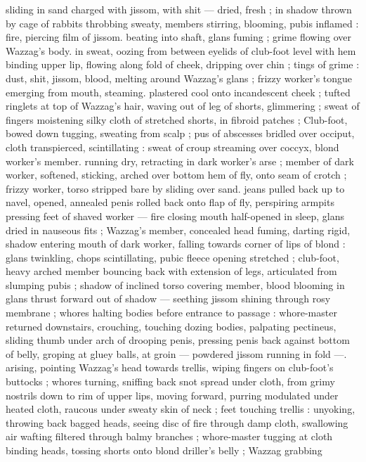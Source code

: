 sliding in sand charged with jissom, with shit --- dried, fresh ; in
shadow thrown by cage of rabbits throbbing sweaty, members
stirring, blooming, pubis inflamed : fire, piercing film of jissom.
beating into shaft, glans fuming ; grime flowing over Wazzag's body.
in sweat, oozing from between eyelids of club-foot level with hem
binding upper lip, flowing along fold of cheek, dripping over chin ;
tings of grime : dust, shit, jissom, blood, melting around Wazzag's
glans ; frizzy worker's tongue emerging from mouth, steaming.
plastered cool onto incandescent cheek ; tufted ringlets at top of
Wazzag's hair, waving out of leg of shorts, glimmering ; sweat of
fingers moistening silky cloth of stretched shorts, in fibroid patches
; Club-foot, bowed down tugging, sweating from scalp ; pus of
abscesses bridled over occiput, cloth transpierced, scintillating :
sweat of croup streaming over coccyx, blond worker's member.
running dry, retracting in dark worker's arse ; member of dark
worker, softened, sticking, arched over bottom hem of fly, onto seam
of crotch ; frizzy worker, torso stripped bare by sliding over sand.
jeans pulled back up to navel, opened, annealed penis rolled back
onto flap of fly, perspiring armpits pressing feet of shaved worker ---
fire closing mouth half-opened in sleep, glans dried in nauseous fits
; Wazzag's member, concealed head fuming, darting rigid, shadow
entering mouth of dark worker, falling towards corner of lips of
blond : glans twinkling, chops scintillating, pubic fleece opening
stretched ; club-foot, heavy arched member bouncing back with
extension of legs, articulated from slumping pubis ; shadow of
inclined torso covering member, blood blooming in glans thrust
forward out of shadow --- seething jissom shining through rosy
membrane ; whores halting bodies before entrance to passage :
whore-master returned downstairs, crouching, touching dozing
bodies, palpating pectineus, sliding thumb under arch of drooping
penis, pressing penis back against bottom of belly, groping at gluey
balls, at groin --- powdered jissom running in fold ---. arising,
pointing Wazzag's head towards trellis, wiping fingers on club-foot's
buttocks ; whores turning, sniffing back snot spread under cloth,
from grimy nostrils down to rim of upper lips, moving forward,
purring modulated under heated cloth, raucous under sweaty skin of
neck ; feet touching trellis : unyoking, throwing back bagged heads,
seeing disc of fire through damp cloth, swallowing air wafting filtered
through balmy branches ; whore-master tugging at cloth binding
heads, tossing shorts onto blond driller's belly ; Wazzag grabbing
